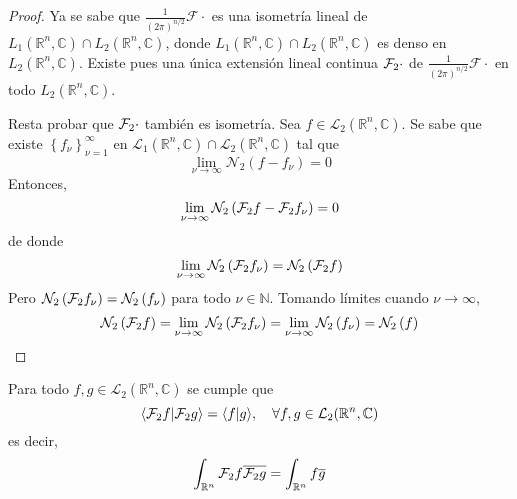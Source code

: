 \documentclass[12pt]{report}
\newcounter{it}
\theoremstyle{largebreak}
\newcommand\pint[2]{\ensuremath{\langle#1| #2\rangle}}
\newcommand\conj[1]{\ensuremath{\overline{#1}}}
\newcommand{\N}[2]{\ensuremath{\mathcal{N}_{#1}\left(#2\right)}}
\newcommand{\fou}[1]{\ensuremath{\mathcal{F}#1}}
\begin{document}
    \begin{proof}
        Ya se sabe que $\frac{1}{(2\pi)^{ n/2}}\fou{\cdot}$ es una isometría lineal de $L_1(\mathbb{R}^n,\mathbb{C})\cap L_2(\mathbb{R}^n,\mathbb{C})$, donde $L_1(\mathbb{R}^n,\mathbb{C})\cap L_2(\mathbb{R}^n,\mathbb{C})$ es denso en $L_2(\mathbb{R}^n,\mathbb{C})$. Existe pues una única extensión lineal continua $\fou_2{\cdot}$ de $\frac{1}{(2\pi)^{ n/2}}\fou{\cdot}$ en todo $L_2(\mathbb{R}^n,\mathbb{C})$.

        Resta probar que $\fou_2{\cdot}$ también es isometría. Sea $f\in\mathcal{L}_2(\mathbb{R}^n,\mathbb{C})$. Se sabe que existe $\left\{f_\nu\right\}_{\nu=1}^\infty$ en $\mathcal{L}_1(\mathbb{R}^n,\mathbb{C})\cap\mathcal{L}_2(\mathbb{R}^n,\mathbb{C})$ tal que
        \begin{equation*}
            \lim_{\nu\rightarrow\infty}\N{2}{f-f_\nu}=0
        \end{equation*}
        Entonces,
        \begin{equation*}
            \lim_{\nu\rightarrow\infty}\N{2}{\fou_2{f}-\fou_2{f_\nu}}=0
        \end{equation*}
        de donde
        \begin{equation*}
            \lim_{\nu\rightarrow\infty}\N{2}{\fou_2{f_\nu}}=\N{2}{\fou_2{f}}
        \end{equation*}
        Pero $\N{2}{\fou_2{f_\nu}}=\N{2}{f_\nu}$ para todo $\nu\in\mathbb{N}$. Tomando límites cuando $\nu\rightarrow\infty$,
        \begin{equation*}
            \N{2}{\fou_2{f}}=\lim_{\nu\rightarrow\infty}\N{2}{\fou_2{f_\nu}}=\lim_{\nu\rightarrow\infty}\N{2}{f_\nu}=\N{2}{f}
        \end{equation*}
    \end{proof}

    \begin{theor}
        Para todo $f,g\in\mathcal{L}_2(\mathbb{R}^n,\mathbb{C})$ se cumple que
        \begin{equation*}
            \pint{\fou_2{f}}{\fou_2{g}}=\pint{f}{g},\quad\forall f,g\in\mathcal{L}_2(\mathbb{R}^n,\mathbb{C})
        \end{equation*}
        es decir,
        \begin{equation*}
            \int_{\mathbb{R}^n}\fou_2{f}\conj{\fou_2{g}}=\int_{\mathbb{R}^n}f\conj{g}
        \end{equation*}
    \end{theor}
\end{document}
